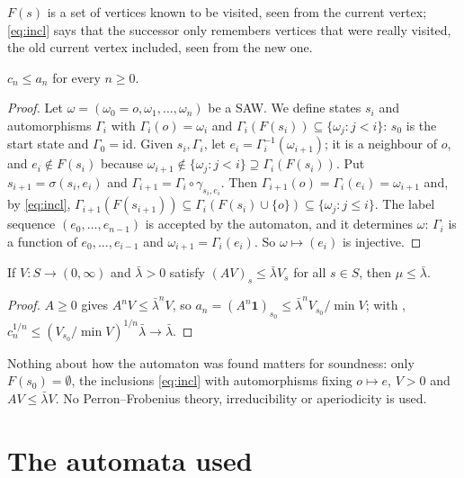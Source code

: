 \documentclass[11pt,a4paper]{report}
\begin{document}
\(F(s)\) is a set of vertices known to be visited, seen from the current vertex; \eqref{eq:incl} says that the
successor only remembers vertices that were really visited, the old current vertex included, seen from the new one.

\begin{lemma}[note=domination]\label{lem:dom}
\(c_n\le a_n\) for every \(n\ge0\).
\end{lemma}
\begin{proof}
Let \(\omega=(\omega_0=o,\omega_1,\dots,\omega_n)\) be a SAW. We define states \(s_i\) and automorphisms \(\Gamma_i\)
with \(\Gamma_i(o)=\omega_i\) and \(\Gamma_i(F(s_i))\subseteq\{\omega_j:j<i\}\): \(s_0\) is the start state and
\(\Gamma_0=\mathrm{id}\). Given \(s_i,\Gamma_i\), let \(e_i=\Gamma_i^{-1}(\omega_{i+1})\); it is a neighbour of \(o\),
and \(e_i\notin F(s_i)\) because \(\omega_{i+1}\notin\{\omega_j:j<i\}\supseteq\Gamma_i(F(s_i))\). Put
\(s_{i+1}=\sigma(s_i,e_i)\) and \(\Gamma_{i+1}=\Gamma_i\circ\gamma_{s_i,e_i}\). Then \(\Gamma_{i+1}(o)=\Gamma_i(e_i)=\omega_{i+1}\)
and, by \eqref{eq:incl}, \(\Gamma_{i+1}(F(s_{i+1}))\subseteq\Gamma_i(F(s_i)\cup\{o\})\subseteq\{\omega_j:j\le i\}\). The
label sequence \((e_0,\dots,e_{n-1})\) is accepted by the automaton, and it determines \(\omega\): \(\Gamma_i\) is a
function of \(e_0,\dots,e_{i-1}\) and \(\omega_{i+1}=\Gamma_i(e_i)\). So \(\omega\mapsto(e_i)\) is injective.
\end{proof}

\begin{lemma}[note=one-sided Collatz--Wielandt bound]\label{lem:cw}
If \(V:S\to(0,\infty)\) and \(\bar\lambda>0\) satisfy \((AV)_s\le\bar\lambda V_s\) for all \(s\in S\), then
\(\mu\le\bar\lambda\).
\end{lemma}
\begin{proof}
\(A\ge0\) gives \(A^nV\le\bar\lambda^nV\), so \(a_n=(A^n\mathbf1)_{s_0}\le\bar\lambda^nV_{s_0}/\min V\); with
, \(c_n^{1/n}\le(V_{s_0}/\min V)^{1/n}\bar\lambda\to\bar\lambda\).
\end{proof}

Nothing about how the automaton was found matters for soundness: only \(F(s_0)=\emptyset\), the inclusions
\eqref{eq:incl} with automorphisms fixing \(o\mapsto e\), \(V>0\) and \(AV\le\bar\lambda V\). No Perron--Frobenius
theory, irreducibility or aperiodicity is used.

\section{The automata used}\label{sec:construction}
\end{document}
